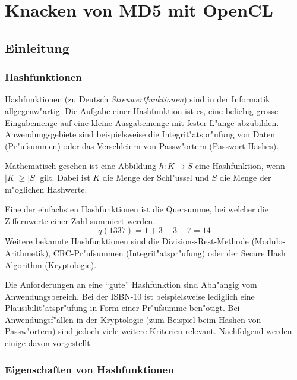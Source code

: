 \chapter{Knacken von MD5 mit OpenCL}
\begin{refsection}


\section{Einleitung}


\subsection{Hashfunktionen}

Hashfunktionen (zu Deutsch \textit{Streuwertfunktionen}) sind in der Informatik
allgegenw"artig. Die Aufgabe einer Hashfunktion ist es, eine beliebig grosse
Eingabemenge auf eine kleine Ausgabemenge mit fester L"ange abzubilden.
Anwendungsgebiete sind beispielsweise die Integrit"atspr"ufung von Daten
(Pr"ufsummen) oder das Verschleiern von Passw"ortern (Passwort-Hashes).

Mathematisch gesehen ist eine Abbildung $h: K \rightarrow S$ eine Hashfunktion,
wenn $|K| \geq |S|$ gilt. Dabei ist $K$ die Menge der Schl"ussel und $S$ die
Menge der m"oglichen Hashwerte.

Eine der einfachsten Hashfunktionen ist die Quersumme, bei welcher die
Ziffernwerte einer Zahl summiert werden.
\[
	q(1337) = 1 + 3 + 3 + 7 = 14
\]
Weitere bekannte Hashfunktionen sind die Divisions-Rest-Methode
(Modulo-Arithmetik), CRC-Pr"ufsummen (Integrit"atspr"ufung) oder der Secure Hash
Algorithm (Kryptologie).

Die Anforderungen an eine ``gute'' Hashfunktion sind Abh"angig vom
Anwendungsbereich. Bei der ISBN-10 ist beispielsweise lediglich eine
Plausibilit"atspr"ufung in Form einer Pr"ufsumme ben"otigt. Bei
Anwendungsf"allen in der Kryptologie (zum Beispiel beim Hashen von Passw"ortern)
sind jedoch viele weitere Kriterien relevant. Nachfolgend werden einige davon
vorgestellt.

\subsection{Eigenschaften von Hashfunktionen}


\end{refsection}
